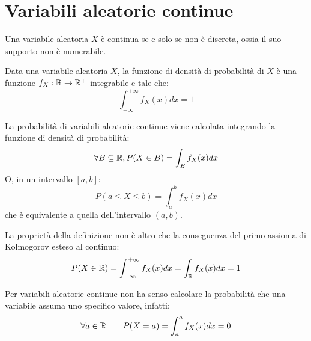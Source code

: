 %
%
%
%


\section{Variabili aleatorie continue}
\begin{defin}
	Una variabile aleatoria $X$ è continua se e solo se non è discreta, ossia il suo supporto non è numerabile.
\end{defin}

\begin{defin}
	Data una variabile aleatoria $X$, la funzione di densità di probabilità di $X$ è una funzione $f_X:\mathbb R\to\mathbb R^+$ integrabile e tale che:
	\begin{equation*}
		\int_{-\infty}^{+\infty} f_X(x)dx = 1
	\end{equation*}
\end{defin}

La probabilità di variabili aleatorie continue viene calcolata integrando la funzione di densità di probabilità:
\begin{equation*}
	\forall B\subseteq\mathbb R, P(X\in B)=\int_B f_X(x)dx
\end{equation*}
O, in un intervallo $[a,b]$:
\begin{equation*}
	P(a\leq X\leq b)=\int_a^b f_X(x)dx
\end{equation*}
che è equivalente a quella dell'intervallo $(a,b)$.

La proprietà della definizione non è altro che la conseguenza del primo assioma di Kolmogorov esteso al continuo:
\begin{equation*}
	P(X\in\mathbb R) = \int_{-\infty}^{+\infty} f_X(x)dx = \int_\mathbb R f_X(x)dx = 1
\end{equation*}

Per variabili aleatorie continue non ha senso calcolare la probabilità che una variabile assuma uno specifico valore, infatti:
\begin{equation*}
	\forall a\in\mathbb R \qquad P(X=a)=\int_a^a f_X(x)dx=0
\end{equation*}

